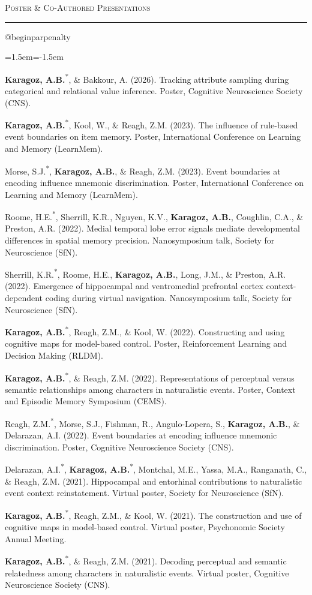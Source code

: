 \documentclass[11pt,letterpaper]{article}
\makeatletter
\newif\ifcvafterhead
\newcommand{\cvsection}[1]{%
  \par\vspace{10pt}%
  {\scshape #1}\par\nopagebreak\vspace{-6pt}%
  \noindent\rule{\textwidth}{0.4pt}\par\nopagebreak\vspace{6pt}%
  \global\cvafterheadtrue}
\newenvironment{cvrefs}
  {\csname @beginparpenalty\endcsname=10000 
   \begin{list}{}{\leftmargin=1.5em\itemindent=-1.5em\itemsep=5pt\topsep=0pt\parsep=0pt}}
  {\end{list}\vspace{2pt}}
\newcommand{\me}{\textbf{Karagoz, A.B.}}
\newcommand{\pres}{\textsuperscript{*}}    %
\newcommand{\note}[1]{\vspace{2pt}{\itshape #1\par}}
\makeatother
\begin{document}
\cvsection{Poster \& Co-Authored Presentations}
\begin{cvrefs}
\item \me\pres, \& Bakkour, A. (2026). Tracking attribute sampling during categorical and relational
  value inference. Poster, Cognitive Neuroscience Society (CNS).
\item \me\pres, Kool, W., \& Reagh, Z.M. (2023). The influence of rule-based event boundaries on
  item memory. Poster, International Conference on Learning and Memory (LearnMem).
\item Morse, S.J.\pres, \me, \& Reagh, Z.M. (2023). Event boundaries at encoding influence mnemonic
  discrimination. Poster, International Conference on Learning and Memory (LearnMem).
\item Roome, H.E.\pres, Sherrill, K.R., Nguyen, K.V., \me, Coughlin, C.A., \& Preston, A.R. (2022).
  Medial temporal lobe error signals mediate developmental differences in spatial memory precision.
  Nanosymposium talk, Society for Neuroscience (SfN).
\item Sherrill, K.R.\pres, Roome, H.E., \me, Long, J.M., \& Preston, A.R. (2022). Emergence of
  hippocampal and ventromedial prefrontal cortex context-dependent coding during virtual navigation.
  Nanosymposium talk, Society for Neuroscience (SfN).
\item \me\pres, Reagh, Z.M., \& Kool, W. (2022). Constructing and using cognitive maps for
  model-based control. Poster, Reinforcement Learning and Decision Making (RLDM).
\item \me\pres, \& Reagh, Z.M. (2022). Representations of perceptual versus semantic relationships
  among characters in naturalistic events. Poster, Context and Episodic Memory Symposium (CEMS).
\item Reagh, Z.M.\pres, Morse, S.J., Fishman, R., Angulo-Lopera, S., \me, \& Delarazan, A.I. (2022).
  Event boundaries at encoding influence mnemonic discrimination. Poster, Cognitive Neuroscience
  Society (CNS).
\item Delarazan, A.I.\pres, \me\pres, Montchal, M.E., Yassa, M.A., Ranganath, C., \& Reagh, Z.M. (2021).
  Hippocampal and entorhinal contributions to naturalistic event context reinstatement. Virtual
  poster, Society for Neuroscience (SfN).
\item \me\pres, Reagh, Z.M., \& Kool, W. (2021). The construction and use of cognitive maps in
  model-based control. Virtual poster, Psychonomic Society Annual Meeting.
\item \me\pres, \& Reagh, Z.M. (2021). Decoding perceptual and semantic relatedness among
  characters in naturalistic events. Virtual poster, Cognitive Neuroscience Society (CNS).
\end{cvrefs}
\note{* denotes presenting author.}
\end{document}
